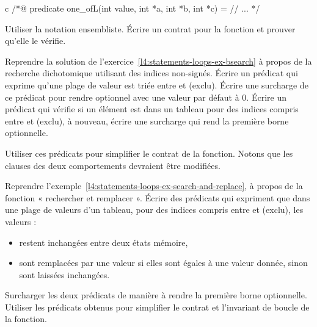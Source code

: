 \begin{CodeBlock}{c}
/*@
  predicate one_of{L}(int value, int *a, int *b, int *c) =
    // ...
*/
\end{CodeBlock}


Utiliser la notation ensembliste. Écrire un contrat pour la fonction et prouver
qu'elle le vérifie.




\label{l4:acsl-properties-predicates-ex-bsearch}


Reprendre la solution de l'exercice~\ref{l4:statements-loops-ex-bsearch} à propos
de la recherche dichotomique utilisant des indices non-signés. Écrire un prédicat
qui exprime qu'une plage de valeur est triée entre  et
 (exclu). Écrire une surcharge de ce prédicat pour rendre
 optionnel avec une valeur par défaut à $0$. Écrire un prédicat
qui vérifie si un élément est dans un tableau pour des indices compris entre
 et  (exclu), à nouveau, écrire une surcharge
qui rend la première borne optionnelle.


Utiliser ces prédicats pour simplifier le contrat de la fonction. Notons que les
clauses  des deux comportements devraient être modifiées.






Reprendre l'exemple~\ref{l4:statements-loops-ex-search-and-replace}, à propos de
la fonction « rechercher et remplacer ». Écrire des prédicats qui expriment
que dans une plage de valeurs d'un tableau, pour des indices compris entre
 et  (exclu), les valeurs :
\begin{itemize}
  \item restent inchangées entre deux états mémoire,
  \item sont remplacées par une valeur si elles sont égales à une valeur donnée,
        sinon sont laissées inchangées.
\end{itemize}


Surcharger les deux prédicats de manière à rendre la première borne optionnelle.
Utiliser les prédicats obtenus pour simplifier le contrat et l'invariant de
boucle de la fonction.


